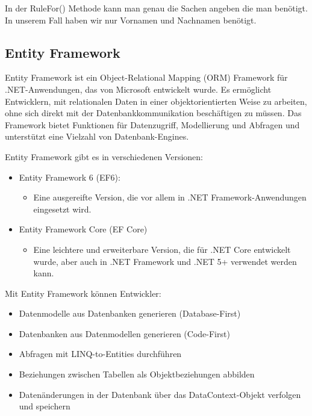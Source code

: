 In der RuleFor() Methode kann man genau die Sachen angeben die man benötigt. 
In unserem Fall haben wir nur Vornamen und Nachnamen benötigt.
\newpage

\subsection{Entity Framework}

Entity Framework ist ein Object-Relational Mapping (ORM) Framework für .NET-Anwendungen, das von Microsoft entwickelt wurde. Es ermöglicht Entwicklern, mit relationalen Daten in einer objektorientierten Weise zu arbeiten, ohne sich direkt mit der Datenbankkommunikation beschäftigen zu müssen. Das Framework bietet Funktionen für Datenzugriff, Modellierung und Abfragen und unterstützt eine Vielzahl von Datenbank-Engines.

Entity Framework gibt es in verschiedenen Versionen:

\begin{itemize}
    \item Entity Framework 6 (EF6): 
    \begin{itemize}
        \item Eine ausgereifte Version, die vor allem in .NET Framework-Anwendungen eingesetzt wird.

    \end{itemize}
\end{itemize}

\begin{itemize}
    \item Entity Framework Core (EF Core)
    \begin{itemize}
        \item Eine leichtere und erweiterbare Version, die für .NET Core entwickelt wurde, aber auch in .NET Framework und .NET 5+ verwendet werden kann.

    \end{itemize}
\end{itemize}

Mit Entity Framework können Entwickler:

\begin{itemize}
    \item Datenmodelle aus Datenbanken generieren (Database-First)
    \item Datenbanken aus Datenmodellen generieren (Code-First)
    \item Abfragen mit LINQ-to-Entities durchführen
    \item Beziehungen zwischen Tabellen als Objektbeziehungen abbilden
    \item Datenänderungen in der Datenbank über das DataContext-Objekt verfolgen und speichern

\end{itemize}

